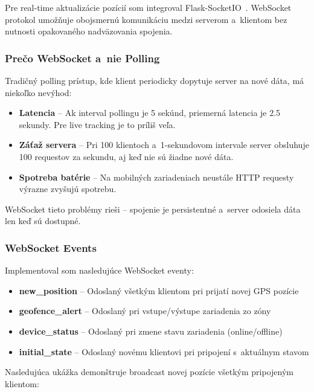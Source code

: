 Pre real-time aktualizácie pozícií som integroval Flask-SocketIO~\cite{socketio_docs}. WebSocket protokol umožňuje obojsmernú komunikáciu medzi serverom a~klientom bez nutnosti opakovaného nadväzovania spojenia.

\subsubsection{Prečo WebSocket a~nie Polling}

Tradičný polling prístup, kde klient periodicky dopytuje server na nové dáta, má niekoľko nevýhod:

\begin{itemize}
    \item \textbf{Latencia} -- Ak interval pollingu je 5 sekúnd, priemerná latencia je 2.5 sekundy. Pre live tracking je to príliš veľa.

    \item \textbf{Záťaž servera} -- Pri 100 klientoch a~1-sekundovom intervale server obsluhuje 100 requestov za sekundu, aj keď nie sú žiadne nové dáta.

    \item \textbf{Spotreba batérie} -- Na mobilných zariadeniach neustále HTTP requesty výrazne zvyšujú spotrebu.
\end{itemize}

WebSocket tieto problémy rieši -- spojenie je persistentné a~server odosiela dáta len keď sú dostupné.

\subsubsection{WebSocket Events}

Implementoval som nasledujúce WebSocket eventy:

\begin{itemize}
    \item \textbf{new\_position} -- Odoslaný všetkým klientom pri prijatí novej GPS pozície
    \item \textbf{geofence\_alert} -- Odoslaný pri vstupe/výstupe zariadenia zo zóny
    \item \textbf{device\_status} -- Odoslaný pri zmene stavu zariadenia (online/offline)
    \item \textbf{initial\_state} -- Odoslaný novému klientovi pri pripojení s~aktuálnym stavom
\end{itemize}

Nasledujúca ukážka demonštruje broadcast novej pozície všetkým pripojeným klientom:

